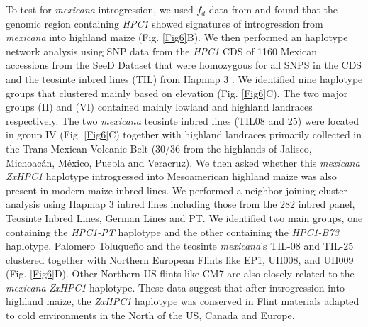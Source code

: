 \documentclass[9pt,twocolumn,twoside,lineno]{BioRxiv}
\begin{document}
To test for \textit{mexicana} introgression, we used \(f_d\) data from \cite{Gonzalez-Segovia2019-jy} and found that the genomic region containing \textit{HPC1} showed signatures of introgression from \textit{mexicana} into highland maize (Fig. \ref{Fig6}B).
We then performed an haplotype network analysis using SNP data from the \textit{HPC1} CDS of 1160 Mexican accessions from the SeeD Dataset \cite{Romero_Navarro2017-cn} that were homozygous for all SNPS in the CDS and the teosinte inbred lines (TIL) from Hapmap 3 \cite{Bukowski2017-ng}.   
We identified nine haplotype groups that clustered mainly based on elevation (Fig. \ref{Fig6}C). 
The two major groups (II) and (VI) contained mainly lowland and highland landraces respectively. 
The two \textit{mexicana} teosinte inbred lines (TIL08 and 25) were located in group IV  (Fig. \ref{Fig6}C) together with highland landraces primarily collected in the Trans-Mexican Volcanic Belt (30/36 from the highlands of Jalisco, Michoacán, México, Puebla and Veracruz).
We then asked whether this \textit{mexicana} \textit{ZxHPC1} haplotype introgressed into Mesoamerican highland maize was also present in modern maize inbred lines. 
We performed a neighbor-joining cluster analysis using Hapmap 3 inbred lines including those from the 282 inbred panel, Teosinte Inbred Lines, German Lines and PT. 
We identified two main groups, one containing the \textit{HPC1-PT} haplotype and the other containing the \textit{HPC1-B73} haplotype.
Palomero Toluqueño and the teosinte \textit{mexicana}'s TIL-08 and TIL-25 clustered together with Northern European Flints like EP1, UH008, and UH009 (Fig. \ref{Fig6}D). 
Other Northern US flints like CM7 are also closely related to the \textit{mexicana} \textit{ZxHPC1} haplotype. 
These data suggest that after introgression into highland maize, the \textit{ZxHPC1} haplotype was conserved in Flint materials adapted to cold environments in the North of the US, Canada and Europe. 
\end{document}
